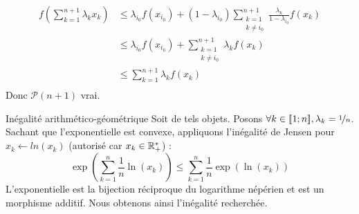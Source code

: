 \documentclass{article}
\begin{document}
\begin{question_kholle}
\begin{itemize}[label=*, leftmargin=0.5cm]
          \begin{equation*}
            \begin{aligned}
              f\left( \sum_{k=1}^{n+1} \lambda_k x_k \right)
               & \leqslant \lambda_{i_0} f(x_{i_0}) + \left( 1 - \lambda_{i_0} \right) \sum_{\begin{array}{c} k = 1 \\ k \neq i_0 \end{array}}^{n+1} \frac{\lambda_k}{1 - \lambda_{i_0}} f\left( x_k \right) \\
               & \leqslant \lambda_{i_0} f(x_{i_0}) + \sum_{\begin{array}{c} k = 1 \\ k \neq i_0 \end{array}}^{n+1} \lambda_k f\left( x_k \right)                                                            \\
               & \leqslant \sum_{k = 1}^{n+1} \lambda_k f\left( x_k \right)                                                                                                                                  \\
            \end{aligned}
          \end{equation*}
          Donc $\mathcal{P}(n+1)$ vrai.
  \end{itemize}
\end{question_kholle}

\begin{question_kholle}
  [Soit $n \in \N^*$. Soit $x \in \R_+^{*n}$.
    \begin{equation}
      \left( \prod_{k=1}^{n} x_k \right)^{\nicefrac{1}{n}}
      \leqslant \frac{1}{n} \sum_{k=1}^{n} x_k
    \end{equation}]
  {Inégalité arithmético-géométrique}
  Soit de tels objets. Posons $\forall k \in [\![1;n]\!], \lambda_k = \nicefrac{1}{n}$. \\
  Sachant que l'exponentielle est convexe, appliquons l'inégalité de Jensen pour $x_k \leftarrow ln(x_k)$ (autorisé car $x_k \in \mathbb R_+^*$) :
  \begin{equation*}
    \exp \left( \sum_{k=1}^{n} \frac{1}{n} \ln \left( x_k \right) \right)
    \leqslant \sum_{k=1}^{n} \frac{1}{n} \exp \left( \ln \left( x_k \right) \right)
  \end{equation*}
  L'exponentielle est la bijection réciproque du logarithme népérien et est un morphisme additif. Nous obtenons ainsi l'inégalité recherchée.
\end{question_kholle}
\end{document}
